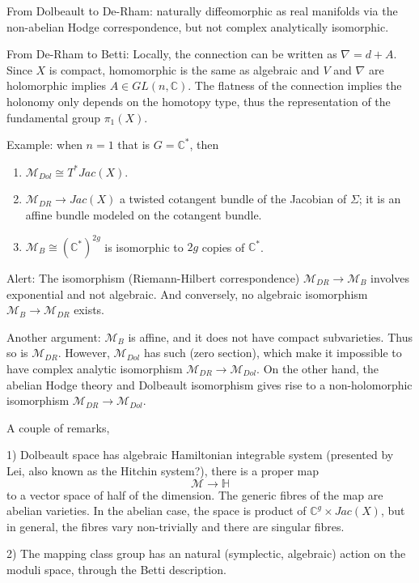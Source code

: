 \documentclass[oneside,english]{amsbook}
\numberwithin{section}{chapter}
\numberwithin{equation}{section}
\numberwithin{figure}{section}
\theoremstyle{plain}
\theoremstyle{definition}
\theoremstyle{remark}
\theoremstyle{definition}
\theoremstyle{definition}
\theoremstyle{plain}
\begin{document}
From Dolbeault to De-Rham: naturally diffeomorphic as real manifolds via the non-abelian Hodge correspondence, but not complex analytically isomorphic.

From De-Rham to Betti: Locally, the connection can be written as $\nabla = d + A$. Since $X$ is compact, homomorphic is the same as algebraic and $V$ and $\nabla$ are holomorphic implies $A\in GL(n,\mathbb{C})$. The flatness of the connection implies the holonomy only depends on the homotopy type, thus the representation of the fundamental group $\pi_1(X)$.

Example: when $n=1$ that is $G = \mathbb{C}^*$, then
\begin{enumerate}
  \item $\mathcal{M}_{Dol} \cong T^*Jac(X)$.
  \item $\mathcal{M}_{DR} \rightarrow Jac(X)$ a twisted cotangent bundle of the Jacobian of $\Sigma$; it is an affine bundle modeled on the cotangent bundle.
  \item $\mathcal{M}_{B} \cong (\mathbb{C}^*)^{2g}$ is isomorphic to $2g$ copies of $\mathbb{C}^*$.
\end{enumerate}

Alert: The isomorphism (Riemann-Hilbert correspondence) $\mathcal{M}_{DR} \rightarrow \mathcal{M}_{B}$ involves exponential and not algebraic. And conversely, no algebraic isomorphism $\mathcal{M}_{B}\rightarrow \mathcal{M}_{DR}$ exists.

Another argument: $\mathcal{M}_{B}$ is affine, and it does not have compact subvarieties. Thus so is $\mathcal{M}_{DR}$. However, $\mathcal{M}_{Dol}$ has such (zero section), which make it impossible to have complex analytic isomorphism $\mathcal{M}_{DR} \rightarrow \mathcal{M}_{Dol}$. On the other hand, the abelian Hodge theory and Dolbeault isomorphism gives rise to a non-holomorphic isomorphism $\mathcal{M}_{DR} \rightarrow \mathcal{M}_{Dol}$.

A couple of remarks,

1) Dolbeault space has algebraic Hamiltonian integrable system (presented by Lei, also known as the Hitchin system?), there is a proper map
$$\mathcal{M}\rightarrow \mathbb{H}$$
to a vector space of half of the dimension. The generic fibres of the map are abelian varieties. In the abelian case, the space is product of $\mathbb{C}^g\times Jac(X)$, but in general, the fibres vary non-trivially and there are singular fibres.

2) The mapping class group has an natural (symplectic, algebraic) action on the moduli space, through the Betti description.
\end{document}
